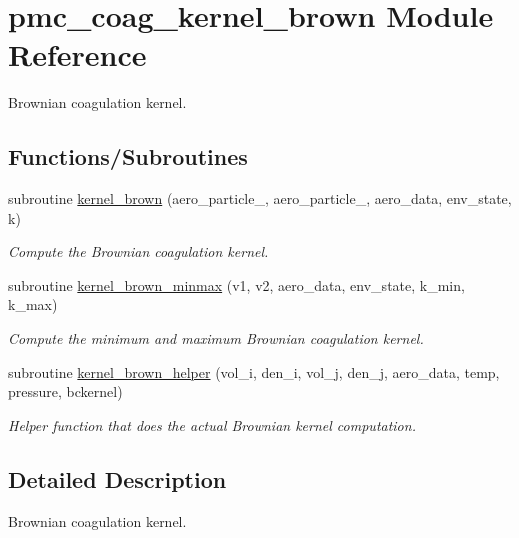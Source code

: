 \hypertarget{namespacepmc__coag__kernel__brown}{}\section{pmc\+\_\+coag\+\_\+kernel\+\_\+brown Module Reference}
\label{namespacepmc__coag__kernel__brown}


Brownian coagulation kernel.  


\subsection*{Functions/\+Subroutines}
\begin{DoxyCompactItemize}
\item 
subroutine \mbox{\hyperlink{namespacepmc__coag__kernel__brown_a88a16189fef47e9f6fdb1f8c5ad6030a}{kernel\+\_\+brown}} (aero\+\_\+particle\+\_, aero\+\_\+particle\+\_, aero\+\_\+data, env\+\_\+state, k)
\begin{DoxyCompactList}\small\item\em Compute the Brownian coagulation kernel. \end{DoxyCompactList}\item 
subroutine \mbox{\hyperlink{namespacepmc__coag__kernel__brown_a928b39a678ff6d18c4794e313257f771}{kernel\+\_\+brown\+\_\+minmax}} (v1, v2, aero\+\_\+data, env\+\_\+state, k\+\_\+min, k\+\_\+max)
\begin{DoxyCompactList}\small\item\em Compute the minimum and maximum Brownian coagulation kernel. \end{DoxyCompactList}\item 
subroutine \mbox{\hyperlink{namespacepmc__coag__kernel__brown_af427aeba502e7eb29067289245b3515f}{kernel\+\_\+brown\+\_\+helper}} (vol\+\_\+i, den\+\_\+i, vol\+\_\+j, den\+\_\+j, aero\+\_\+data, temp, pressure, bckernel)
\begin{DoxyCompactList}\small\item\em Helper function that does the actual Brownian kernel computation. \end{DoxyCompactList}\end{DoxyCompactItemize}


\subsection{Detailed Description}
Brownian coagulation kernel. 

